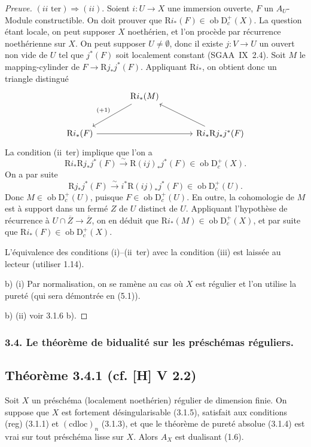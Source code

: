 \documentclass[11pt]{article}
\newcommand{\R}{\mathrm{R}}
\newcommand{\D}{\mathrm{D}}
\newcommand{\ob}{\operatorname{ob}}
\newcommand{\ol}[1]{\overline{#1}}
\providecommand{\ob}{\operatorname{ob}}
\providecommand{\R}{\mathrm R}
\begin{document}
\begin{proof}[Preuve]
$(ii\text{~ter}) \Rightarrow (ii)$. Soient $i : U \to X$ une immersion ouverte, $F$ un $A_U$-Module constructible. On doit prouver que $\R i_{*}(F) \in \ob \D_c^{+}(X)$. La question étant locale, on peut supposer $X$ noethérien, et l'on procède par récurrence noethérienne sur $X$. On peut supposer $U \neq \emptyset$, donc il existe $j : V \to U$ un ouvert non vide de $U$ tel que $j^{*}(F)$ soit localement constant (SGAA~IX~2.4). Soit $M$ le mapping-cylinder de $F \to \R j_{*}j^{*}(F)$. Appliquant $\R i_{*}$, on obtient donc un triangle distingué
\[
\begin{tikzcd}[column sep=large,row sep=large]
& \R i_{*}(M) \arrow[dl,"{(+1)}"'] & \\
\R i_{*}(F) \arrow[rr] & & \R i_{*}\R j_{*}j^{*}(F) \arrow[ul]
\end{tikzcd}
\]
La condition (ii~ter) implique que l'on a
\[
\R i_{*} \R j_{*} j^{*}(F) \xrightarrow{\sim} \R(ij)_{*} j^{*}(F) \in \ob \D_c^{+}(X).
\]
On a par suite
\[
\R j_{*}j^{*}(F) \xrightarrow{\sim} i^{*} \R(ij)_{*} j^{*}(F) \in \ob \D_c^{+}(U).
\]
Donc $M \in \ob \D_c^{+}(U)$, puisque $F \in \ob \D_c^{+}(U)$. En outre, la cohomologie de $M$ est à support dans un fermé $Z$ de $U$ distinct de $U$. Appliquant l'hypothèse de récurrence à $U \cap \ol{Z} \to \ol{Z}$, on en déduit que $\R i_{*}(M) \in \ob \D_c^{+}(X)$, et par suite que $\R i_{*}(F) \in \ob \D_c^{+}(X)$.

L'équivalence des conditions (i)--(ii~ter) avec la condition (iii) est laissée au lecteur (utiliser 1.14).

b) (i) Par normalisation, on se ramène au cas où $X$ est régulier et l'on utilise la pureté (qui sera démontrée en (5.1)).

b) (ii) voir 3.1.6 b).
\end{proof}

\subsubsection{3.4. Le théorème de bidualité sur les préschémas réguliers.}

\subsection*{Théorème 3.4.1 (cf. [H] V 2.2)}
Soit $X$ un préschéma (localement noethérien) régulier de dimension finie. On suppose que $X$ est fortement désingularisable (3.1.5), satisfait aux conditions (reg) (3.1.1) et $(\mathrm{cdloc})_n$ (3.1.3), et que le théorème de pureté absolue (3.1.4) est vrai sur tout préschéma lisse sur $X$. Alors $A_X$ est dualisant (1.6).
\end{document}
